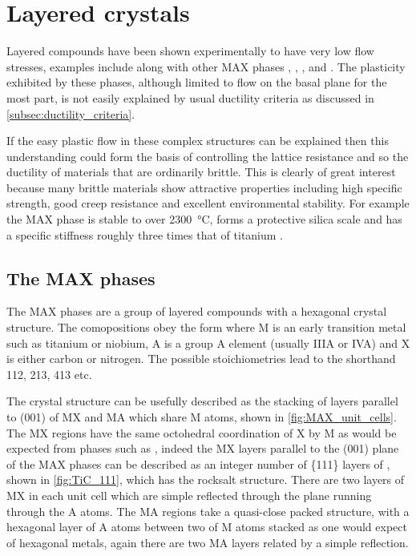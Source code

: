 







\FloatBarrier
\section{Layered crystals}
\FloatBarrier
\label{sec:layered_crystals}



Layered compounds have been shown experimentally to have very low flow stresses, examples include  along with other MAX phases \cite{Barsoum2011},  \cite{Korte2012NbCo},  \cite{Telle2006},  and  \cite{Sygnatowicz2015}. The plasticity exhibited by these phases, although limited to flow on the basal plane for the most part, is not easily explained by usual ductility criteria as discussed in \autoref{subsec:ductility_criteria}. 

If the easy plastic flow in these complex structures can be explained then this understanding could form the basis of controlling the lattice resistance and so the ductility of materials that are ordinarily brittle. This is clearly of great interest because many brittle materials show attractive properties including high specific strength, good creep resistance and excellent environmental stability. For example the MAX phase  is stable to over \SI{2300}{\celsius}, forms a protective silica scale and has a specific stiffness roughly three times that of titanium \cite{Radovic2013}.

\subsection{The MAX phases}

The MAX phases are a group of layered compounds with a hexagonal crystal structure. The comopositions obey the form  where M is an early transition metal such as titanium or niobium, A is a group A element (usually IIIA or IVA) and X is either carbon or nitrogen. The possible stoichiometries lead to the shorthand 112, 213, 413 etc.

The crystal structure can be usefully described as the stacking of layers parallel to (001) of MX and MA which share M atoms,  shown in \autoref{fig:MAX_unit_cells}. The MX regions have the same octohedral coordination of X by M as would be expected from phases such as , indeed the MX layers parallel to the (001) plane of the MAX phases can be described as an integer number of \{111\} layers of , shown in \autoref{fig:TiC_111}, which has the rocksalt structure. There are two layers of MX in each unit cell which are simple reflected through the plane running through the A atoms. The MA regions take a quasi-close packed structure, with a hexagonal layer of A atoms between two of M atoms stacked as one would expect of hexagonal metals, again there are two MA layers related by a simple reflection.


